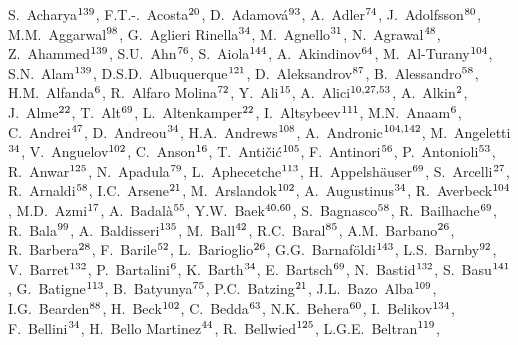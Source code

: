
%
\begingroup
\small
\begin{flushleft}
S.~Acharya$^{\rm 139}$, 
F.T.-.~Acosta$^{\rm 20}$, 
D.~Adamov\'{a}$^{\rm 93}$, 
A.~Adler$^{\rm 74}$, 
J.~Adolfsson$^{\rm 80}$, 
M.M.~Aggarwal$^{\rm 98}$, 
G.~Aglieri Rinella$^{\rm 34}$, 
M.~Agnello$^{\rm 31}$, 
N.~Agrawal$^{\rm 48}$, 
Z.~Ahammed$^{\rm 139}$, 
S.U.~Ahn$^{\rm 76}$, 
S.~Aiola$^{\rm 144}$, 
A.~Akindinov$^{\rm 64}$, 
M.~Al-Turany$^{\rm 104}$, 
S.N.~Alam$^{\rm 139}$, 
D.S.D.~Albuquerque$^{\rm 121}$, 
D.~Aleksandrov$^{\rm 87}$, 
B.~Alessandro$^{\rm 58}$, 
H.M.~Alfanda$^{\rm 6}$, 
R.~Alfaro Molina$^{\rm 72}$, 
Y.~Ali$^{\rm 15}$, 
A.~Alici$^{\rm 10,27,53}$, 
A.~Alkin$^{\rm 2}$, 
J.~Alme$^{\rm 22}$, 
T.~Alt$^{\rm 69}$, 
L.~Altenkamper$^{\rm 22}$, 
I.~Altsybeev$^{\rm 111}$, 
M.N.~Anaam$^{\rm 6}$, 
C.~Andrei$^{\rm 47}$, 
D.~Andreou$^{\rm 34}$, 
H.A.~Andrews$^{\rm 108}$, 
A.~Andronic$^{\rm 104,142}$, 
M.~Angeletti$^{\rm 34}$, 
V.~Anguelov$^{\rm 102}$, 
C.~Anson$^{\rm 16}$, 
T.~Anti\v{c}i\'{c}$^{\rm 105}$, 
F.~Antinori$^{\rm 56}$, 
P.~Antonioli$^{\rm 53}$, 
R.~Anwar$^{\rm 125}$, 
N.~Apadula$^{\rm 79}$, 
L.~Aphecetche$^{\rm 113}$, 
H.~Appelsh\"{a}user$^{\rm 69}$, 
S.~Arcelli$^{\rm 27}$, 
R.~Arnaldi$^{\rm 58}$, 
I.C.~Arsene$^{\rm 21}$, 
M.~Arslandok$^{\rm 102}$, 
A.~Augustinus$^{\rm 34}$, 
R.~Averbeck$^{\rm 104}$, 
M.D.~Azmi$^{\rm 17}$, 
A.~Badal\`{a}$^{\rm 55}$, 
Y.W.~Baek$^{\rm 40,60}$, 
S.~Bagnasco$^{\rm 58}$, 
R.~Bailhache$^{\rm 69}$, 
R.~Bala$^{\rm 99}$, 
A.~Baldisseri$^{\rm 135}$, 
M.~Ball$^{\rm 42}$, 
R.C.~Baral$^{\rm 85}$, 
A.M.~Barbano$^{\rm 26}$, 
R.~Barbera$^{\rm 28}$, 
F.~Barile$^{\rm 52}$, 
L.~Barioglio$^{\rm 26}$, 
G.G.~Barnaf\"{o}ldi$^{\rm 143}$, 
L.S.~Barnby$^{\rm 92}$, 
V.~Barret$^{\rm 132}$, 
P.~Bartalini$^{\rm 6}$, 
K.~Barth$^{\rm 34}$, 
E.~Bartsch$^{\rm 69}$, 
N.~Bastid$^{\rm 132}$, 
S.~Basu$^{\rm 141}$, 
G.~Batigne$^{\rm 113}$, 
B.~Batyunya$^{\rm 75}$, 
P.C.~Batzing$^{\rm 21}$, 
J.L.~Bazo~Alba$^{\rm 109}$, 
I.G.~Bearden$^{\rm 88}$, 
H.~Beck$^{\rm 102}$, 
C.~Bedda$^{\rm 63}$, 
N.K.~Behera$^{\rm 60}$, 
I.~Belikov$^{\rm 134}$, 
F.~Bellini$^{\rm 34}$, 
H.~Bello Martinez$^{\rm 44}$, 
R.~Bellwied$^{\rm 125}$, 
L.G.E.~Beltran$^{\rm 119}$, 

\end{flushleft}
